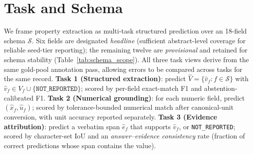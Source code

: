 \documentclass{article}
\newcommand{\NR}{\texttt{NOT\_REPORTED}}
\begin{document}

\section{Task and Schema}
\label{sec:task}

We frame property extraction as multi-task structured prediction over an 18-field schema $\mathcal{S}$. Six fields are designated \emph{headline} (sufficient abstract-level coverage for reliable seed-tier reporting); the remaining twelve are \emph{provisional} and retained for schema stability (Table~\ref{tab:schema_scope}). All three task views derive from the same gold-pool annotation pass, allowing errors to be compared across tasks for the same record.
\textbf{Task 1 (Structured extraction)}: predict $\hat{V}=\{\hat{v}_f : f \in \mathcal{S}\}$ with $\hat{v}_f \in V_f \cup \{\NR{}\}$; scored by per-field exact-match F1 and abstention-calibrated F1.
\textbf{Task 2 (Numerical grounding)}: for each numeric field, predict $(\hat{x}_f, \hat{u}_f)$; scored by tolerance-bounded numerical match after canonical-unit conversion, with unit accuracy reported separately.
\textbf{Task 3 (Evidence attribution)}: predict a verbatim span $\hat{e}_f$ that supports $\hat{v}_f$, or \NR{}; scored by character-set IoU and an \emph{answer--evidence consistency} rate (fraction of correct predictions whose span contains the value).
\end{document}
